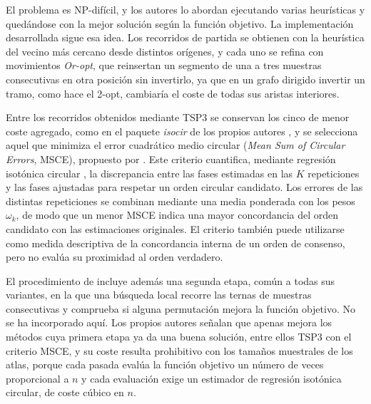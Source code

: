 \documentclass[12pt, a4paper]{report}
\begin{document}
El problema es NP-difícil, y los autores lo abordan ejecutando varias heurísticas y quedándose con la mejor solución según la función objetivo. La implementación desarrollada sigue esa idea. Los recorridos de partida se obtienen con la heurística del vecino más cercano desde distintos orígenes, y cada uno se refina con movimientos \textit{Or-opt}, que reinsertan un segmento de una a tres muestras consecutivas en otra posición sin invertirlo, ya que en un grafo dirigido invertir un tramo, como hace el 2-opt, cambiaría el coste de todas sus aristas interiores.

Entre los recorridos obtenidos mediante TSP3 se conservan los cinco de menor coste agregado, como en el paquete \textit{isocir} de los propios autores \citep{barragan2013isocir}, y se selecciona aquel que minimiza el error cuadrático medio circular (\textit{Mean Sum of Circular Errors}, MSCE), propuesto por \citet{barragan2015}. Este criterio cuantifica, mediante regresión isotónica circular \citep{rueda2009cire}, la discrepancia entre las fases estimadas en las \(K\) repeticiones y las fases ajustadas para respetar un orden circular candidato. Los errores de las distintas repeticiones se combinan mediante una media ponderada con los pesos \(\omega_k\), de modo que un menor MSCE indica una mayor concordancia del orden candidato con las estimaciones originales. El criterio también puede utilizarse como medida descriptiva de la concordancia interna de un orden de consenso, pero no evalúa su proximidad al orden verdadero.

El procedimiento de \citet{barragan2015} incluye además una segunda etapa, común a todas sus variantes, en la que una búsqueda local recorre las ternas de muestras consecutivas y comprueba si alguna permutación mejora la función objetivo. No se ha incorporado aquí. Los propios autores señalan que apenas mejora los métodos cuya primera etapa ya da una buena solución, entre ellos TSP3 con el criterio MSCE, y su coste resulta prohibitivo con los tamaños muestrales de los atlas, porque cada pasada evalúa la función objetivo un número de veces proporcional a \(n\) y cada evaluación exige un estimador de regresión isotónica circular, de coste cúbico en \(n\).
\end{document}

